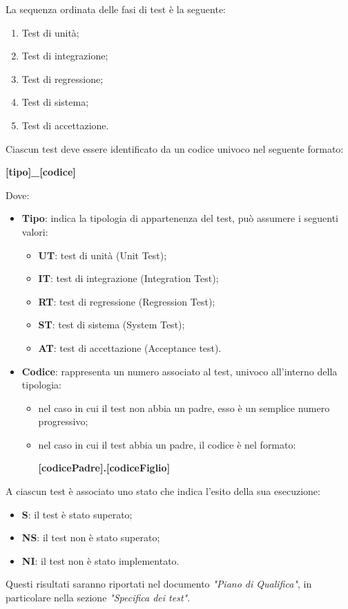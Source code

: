 La sequenza ordinata delle fasi di test è la seguente:
\begin{enumerate}
	\item Test di unità;
	\item Test di integrazione;
	\item Test di regressione;
	\item Test di sistema;
	\item Test di accettazione.
\end{enumerate}

Ciascun test deve essere identificato da un codice univoco nel seguente formato:
\begin{center}
	\textbf{[tipo]\_[codice]}
\end{center}
Dove:
\begin{itemize}
	\item \textbf{Tipo}: indica la tipologia di appartenenza del test, può assumere i seguenti valori:
	      \begin{itemize}
		      \item \textbf{UT}: test di unità (Unit Test);
		      \item \textbf{IT}: test di integrazione (Integration Test);
		      \item \textbf{RT}: test di regressione (Regression Test);
		      \item \textbf{ST}: test di sistema (System Test);
		      \item \textbf{AT}: test di accettazione (Acceptance test).
	      \end{itemize}
	\item \textbf{Codice}: rappresenta un numero associato al test, univoco all'interno della tipologia:
	      \begin{itemize}
		      \item nel caso in cui il test non abbia un padre, esso è un semplice numero progressivo;
		      \item nel caso in cui il test abbia un padre, il codice è nel formato:
		            \begin{center}
			            \textbf{[codicePadre].[codiceFiglio]}
		            \end{center}
	      \end{itemize}
\end{itemize}

A ciascun test è associato uno stato che indica l'esito della sua esecuzione:
\begin{itemize}
	\item \textbf{S}: il test è stato superato;
	\item \textbf{NS}: il test non è stato superato;
	\item \textbf{NI}: il test non è stato implementato.
\end{itemize}
Questi risultati saranno riportati nel documento \textit{"Piano di Qualifica"}, in particolare nella sezione \textit{"Specifica dei test"}.

